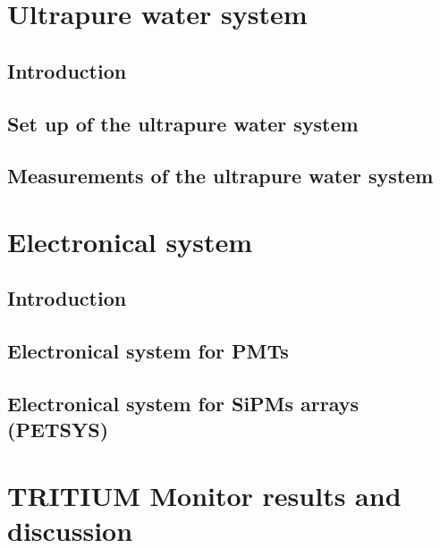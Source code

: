 \documentclass[12pt,a4paper]{book}
\begin{document}
\chapter{Ultrapure water system}\label{chap:Ultrapure}
	\section{Introduction}
	\newpage
	
	\section[Set up of water system]{Set up of the ultrapure water system}
	\newpage
	
	\section[Measurements of water system]{Measurements of the ultrapure water system}
	\newpage
	
\chapter{Electronical system}\label{chap:Electronic}
	\section{Introduction}
	\newpage
	
	\section[Electronical system for PMTs]{Electronical system for PMTs}
	\newpage
	
	\section[PETSYS (SiPMs)]{Electronical system for SiPMs arrays (PETSYS) }
	\newpage
	
\chapter[Results and discussion]{TRITIUM Monitor results and discussion}\label{chap:Results}
\end{document}
